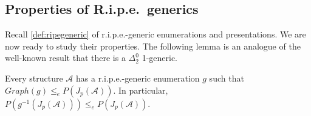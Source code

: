 \documentclass[11pt]{amsart}
\newcommand{\A}{{\mathcal{A}}}
\newcommand{\B}{{\mathcal{B}}}
\newcommand{\oneone}{1{-}1}
\begin{document}
\subsection{Properties of R.i.p.e.\ generics}\label{sec:ripegenerics}

Recall \cref{def:ripegeneric} of r.i.p.e.-generic enumerations and presentations. We are now ready to study their properties.
The following lemma is an analogue of the well-known result that there is a $\Delta^0_2$ 1-generic.
\begin{lem}\label{lemma:generic}
    Every structure $\A$ has a r.i.p.e.-generic enumeration $g$ such that $Graph(g) \leq_e P(J_p(\A))$. In particular, $P(g^{-1}(J_p(\A)))\leq_e P(J_p(\A))$.
\end{lem}
\end{document}
